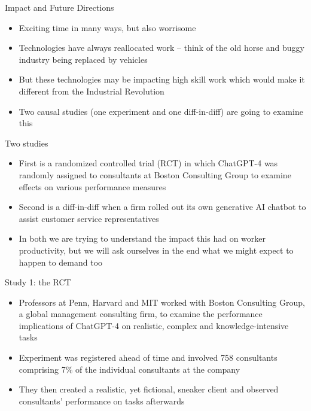 \documentclass{beamer}
\begin{document}
\begin{frame}{Impact and Future Directions}
\begin{itemize}
	\item Exciting time in many ways, but also worrisome
	\item Technologies have always reallocated work -- think of the old horse and buggy industry being replaced by vehicles 
	\item But these technologies may be impacting high skill work which would make it different from the Industrial Revolution
	\item Two causal studies (one experiment and one diff-in-diff) are going to examine this
\end{itemize}
\end{frame}


\begin{frame}{Two studies}

\begin{itemize}

\item First is a randomized controlled trial (RCT) in which ChatGPT-4 was randomly assigned to consultants at Boston Consulting Group to examine  effects on various performance measures
\item Second is a diff-in-diff when a firm rolled out its own generative AI chatbot to assist customer service representatives
\item In both we are trying to understand the impact this had on worker productivity, but we will ask ourselves in the end what we might expect to happen to demand too
\end{itemize}

\end{frame}


\begin{frame}{Study 1: the RCT}

\begin{itemize}

\item Professors at Penn, Harvard and MIT worked with Boston Consulting Group, a global management consulting firm, to examine the performance implications of ChatGPT-4 on realistic, complex and knowledge-intensive tasks
\item Experiment was registered ahead of time and involved 758 consultants comprising 7\% of the individual consultants at the company
\item They then created a realistic, yet fictional, sneaker client and observed consultants' performance on tasks afterwards
\end{itemize}

\end{frame}
\end{document}
